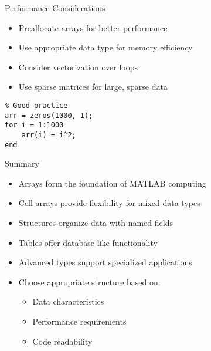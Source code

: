 \documentclass[10pt]{beamer}
\theoremstyle{plain}%
\theoremstyle{definition}
\theoremstyle{remark}
\begin{document}
\begin{frame}[fragile]{Performance Considerations}
    \begin{itemize}
        \item Preallocate arrays for better performance
        \item Use appropriate data type for memory efficiency
        \item Consider vectorization over loops
        \item Use sparse matrices for large, sparse data
    \end{itemize}
    \begin{lstlisting}
% Good practice
arr = zeros(1000, 1);
for i = 1:1000
    arr(i) = i^2;
end
    \end{lstlisting}
\end{frame}

\begin{frame}[fragile]{Summary}
    \begin{itemize}
        \item Arrays form the foundation of MATLAB computing
        \item Cell arrays provide flexibility for mixed data types
        \item Structures organize data with named fields
        \item Tables offer database-like functionality
        \item Advanced types support specialized applications
        \item Choose appropriate structure based on:
            \begin{itemize}
                \item Data characteristics
                \item Performance requirements
                \item Code readability
            \end{itemize}
    \end{itemize}
\end{frame}
\end{document}
